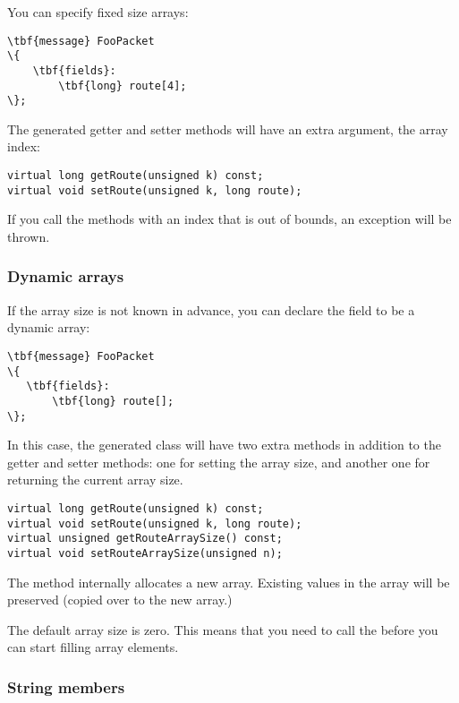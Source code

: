 You can specify fixed size arrays:

\begin{Verbatim}[commandchars=\\\{\}]
\tbf{message} FooPacket
\{
    \tbf{fields}:
        \tbf{long} route[4];
\};
\end{Verbatim}

The generated getter and setter methods will have an extra  argument,
the array index:

\begin{verbatim}
virtual long getRoute(unsigned k) const;
virtual void setRoute(unsigned k, long route);
\end{verbatim}

If you call the methods with an index that is out of bounds, an exception
will be thrown.


\subsubsection{Dynamic arrays}

If the array size is not known in advance, you can declare the field
to be a dynamic array:

\begin{Verbatim}[commandchars=\\\{\}]
\tbf{message} FooPacket
\{
   \tbf{fields}:
       \tbf{long} route[];
\};
\end{Verbatim}

In this case, the generated class will have two extra methods in addition
to the getter and setter methods: one for setting the array size, and another
one for returning the current array size.

\begin{verbatim}
virtual long getRoute(unsigned k) const;
virtual void setRoute(unsigned k, long route);
virtual unsigned getRouteArraySize() const;
virtual void setRouteArraySize(unsigned n);
\end{verbatim}

The  method internally allocates a new array. Existing
values in the array will be preserved (copied over to the new array.)

The default array size is zero. This means that you need to call the
 before you can start filling array elements.


\subsubsection{String members}

